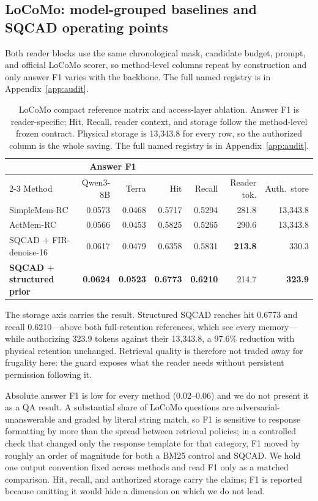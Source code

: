 \documentclass{article}
\newcommand{\SQCAD}{\textsc{SQCAD}}
\begin{document}
\subsection{LoCoMo: model-grouped baselines and SQCAD operating points}
Both reader blocks use the same chronological mask, candidate budget, prompt, and
official LoCoMo scorer, so method-level columns repeat by construction and only
answer F1 varies with the backbone. The full named registry is in
Appendix~\ref{app:audit}.
\begin{table}[!ht]
\caption{LoCoMo compact reference matrix and access-layer ablation. Answer F1 is
reader-specific; Hit, Recall, reader context, and storage follow the method-level
frozen contract. Physical storage is 13{,}343.8 for every row, so the authorized
column is the whole saving. The full named registry is in
Appendix~\ref{app:audit}.}
\label{tab:locomo_models}
\centering\small
\begin{tabular}{lrrrrrr}
\toprule
& \multicolumn{2}{c}{Answer F1} & & & & \\
\cmidrule(lr){2-3}
Method & Qwen3-8B & Terra & Hit & Recall & Reader tok. & Auth.\ store \\
\midrule
SimpleMem-RC & 0.0573 & 0.0468 & 0.5717 & 0.5294 & 281.8 & 13,343.8 \\
ActMem-RC & 0.0566 & 0.0453 & 0.5825 & 0.5265 & 290.6 & 13,343.8 \\
SQCAD $+$ FIR-denoise-16 & 0.0617 & 0.0479 & 0.6358 & 0.5831 & \textbf{213.8} & 330.3 \\
\textbf{SQCAD $+$ structured prior} & \textbf{0.0624} & \textbf{0.0523} & \textbf{0.6773} & \textbf{0.6210} & 214.7 & \textbf{323.9} \\
\bottomrule
\end{tabular}
\end{table}

The storage axis carries the result. Structured \SQCAD{} reaches hit 0.6773 and
recall 0.6210---above both full-retention references, which see every memory---while
authorizing 323.9 tokens against their 13{,}343.8, a $97.6\%$ reduction with
physical retention unchanged. Retrieval quality is therefore not traded away for
frugality here: the guard exposes what the reader needs without persistent
permission following it.

Absolute answer F1 is low for every method (0.02--0.06) and we do not present it as
a QA result. A substantial share of LoCoMo questions are adversarial-unanswerable
and graded by literal string match, so F1 is sensitive to response formatting by
more than the spread between retrieval policies; in a controlled check that changed
only the response template for that category, F1 moved by roughly an order of
magnitude for both a BM25 control and \SQCAD{}. We hold one output convention fixed
across methods and read F1 only as a matched comparison. Hit, recall, and
authorized storage carry the claims; F1 is reported because omitting it would hide
a dimension on which we do not lead.
\end{document}
